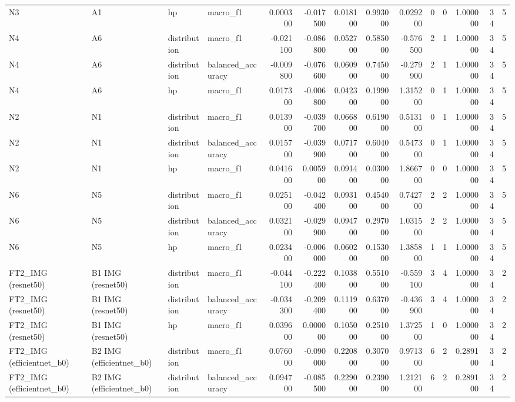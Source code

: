 \begin{table}
\begin{tabular}{llllrrrrrrrrrr}
N3 & A1 & hp & macro\_f1 & 0.000300 & -0.017500 & 0.018100 & 0.993000 & 0.029200 & 0 & 0 & 1.000000 & 34 & 5 \\
N4 & A6 & distribution & macro\_f1 & -0.021100 & -0.086800 & 0.052700 & 0.585000 & -0.576500 & 2 & 1 & 1.000000 & 34 & 5 \\
N4 & A6 & distribution & balanced\_accuracy & -0.009800 & -0.076600 & 0.060900 & 0.745000 & -0.279900 & 2 & 1 & 1.000000 & 34 & 5 \\
N4 & A6 & hp & macro\_f1 & 0.017300 & -0.006800 & 0.042300 & 0.199000 & 1.315200 & 0 & 1 & 1.000000 & 34 & 5 \\
N2 & N1 & distribution & macro\_f1 & 0.013900 & -0.039700 & 0.066800 & 0.619000 & 0.513100 & 0 & 1 & 1.000000 & 34 & 5 \\
N2 & N1 & distribution & balanced\_accuracy & 0.015700 & -0.039900 & 0.071700 & 0.604000 & 0.547300 & 0 & 1 & 1.000000 & 34 & 5 \\
N2 & N1 & hp & macro\_f1 & 0.041600 & 0.005900 & 0.091400 & 0.030000 & 1.866700 & 0 & 0 & 1.000000 & 34 & 5 \\
N6 & N5 & distribution & macro\_f1 & 0.025100 & -0.042400 & 0.093100 & 0.454000 & 0.742700 & 2 & 2 & 1.000000 & 34 & 5 \\
N6 & N5 & distribution & balanced\_accuracy & 0.032100 & -0.029900 & 0.094700 & 0.297000 & 1.031500 & 2 & 2 & 1.000000 & 34 & 5 \\
N6 & N5 & hp & macro\_f1 & 0.023400 & -0.006000 & 0.060200 & 0.153000 & 1.385800 & 1 & 1 & 1.000000 & 34 & 5 \\
FT2\_IMG (resnet50) & B1 IMG (resnet50) & distribution & macro\_f1 & -0.044100 & -0.222400 & 0.103800 & 0.551000 & -0.559100 & 3 & 4 & 1.000000 & 34 & 2 \\
FT2\_IMG (resnet50) & B1 IMG (resnet50) & distribution & balanced\_accuracy & -0.034300 & -0.209400 & 0.111900 & 0.637000 & -0.436900 & 3 & 4 & 1.000000 & 34 & 2 \\
FT2\_IMG (resnet50) & B1 IMG (resnet50) & hp & macro\_f1 & 0.039600 & 0.000000 & 0.105000 & 0.251000 & 1.372500 & 1 & 0 & 1.000000 & 34 & 2 \\
FT2\_IMG (efficientnet\_b0) & B2 IMG (efficientnet\_b0) & distribution & macro\_f1 & 0.076000 & -0.090000 & 0.220800 & 0.307000 & 0.971300 & 6 & 2 & 0.289100 & 34 & 2 \\
FT2\_IMG (efficientnet\_b0) & B2 IMG (efficientnet\_b0) & distribution & balanced\_accuracy & 0.094700 & -0.085500 & 0.229000 & 0.239000 & 1.212100 & 6 & 2 & 0.289100 & 34 & 2 \\

\end{tabular}
\end{table}
